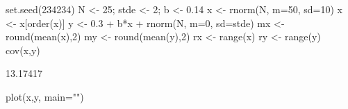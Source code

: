 \begin{Schunk}
\begin{Sinput}
 set.seed(234234)
 N <- 25; stde <- 2; b <- 0.14
 x <- rnorm(N, m=50, sd=10)
 x <- x[order(x)]
 y <- 0.3 + b*x + rnorm(N, m=0, sd=stde)
 mx <- round(mean(x),2)
 my <- round(mean(y),2)
 rx <- range(x)
 ry <- range(y)
 cov(x,y)
\end{Sinput}
\begin{Soutput}
[1] 13.17417
\end{Soutput}
\begin{Sinput}
 plot(x,y, main="")
\end{Sinput}
\end{Schunk}
